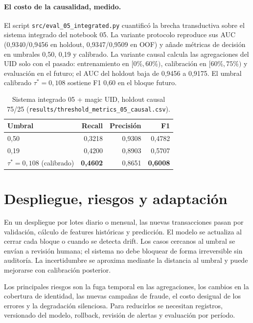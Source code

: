 \documentclass[11pt,a4paper]{article}
\begin{document}
\paragraph{El costo de la causalidad, medido.} El script \texttt{src/eval\_05\_integrated.py}
cuantificó la brecha transductiva sobre el sistema integrado del notebook 05. La variante protocolo
reproduce sus AUC (0,9340/0,9456 en holdout, 0,9347/0,9509 en OOF) y añade métricas de decisión en
umbrales 0,50, 0,19 y calibrado. La variante causal calcula las agregaciones del UID solo con el
pasado: entrenamiento en $[0\%,60\%)$, calibración en $[60\%,75\%)$ y evaluación en el futuro; el AUC
del holdout baja de 0,9456 a 0,9175. El umbral calibrado $\tau^{*}=0{,}108$ sostiene F1 0,60 en el
bloque futuro.

\begin{table}[ht]
\centering
\small
\caption{Sistema integrado 05 + magic UID, holdout causal 75/25 (\texttt{results/threshold\_metrics\_05\_causal.csv}).}
\begin{tabular}{lrrr}
\toprule
Umbral & Recall & Precisión & F1\\
\midrule
\rowcolor{mist}
0,50 & 0,3218 & 0,9308 & 0,4782\\
0,19 & 0,4200 & 0,8903 & 0,5707\\
\rowcolor{mist}
$\tau^{*}=0{,}108$ (calibrado) & \textbf{0,4602} & 0,8651 & \textbf{0,6008}\\
\bottomrule
\end{tabular}
\end{table}

\section{Despliegue, riesgos y adaptación}

En un despliegue por lotes diario o mensual, las nuevas transacciones pasan por validación, cálculo de
features históricas y predicción. El modelo se actualiza al cerrar cada bloque o cuando se detecta
drift. Los casos cercanos al umbral se envían a revisión humana; el sistema no debe bloquear de forma
irreversible sin auditoría. La incertidumbre se aproxima mediante la distancia al umbral y puede
mejorarse con calibración posterior.

Los principales riesgos son la fuga temporal en las agregaciones, los cambios en la cobertura de
identidad, las nuevas campañas de fraude, el costo desigual de los errores y la degradación silenciosa.
Para reducirlos se necesitan registros, versionado del modelo, rollback, revisión de alertas y
evaluación por período.
\end{document}
